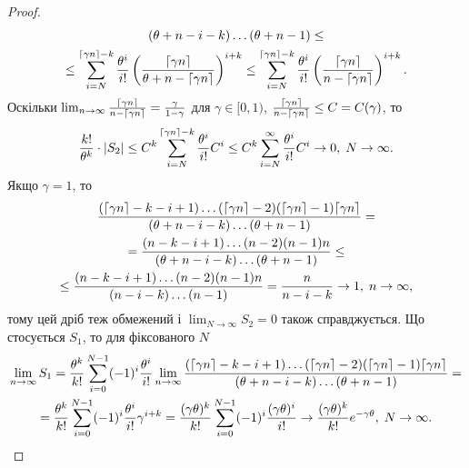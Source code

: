 \begin{proof}
\begin{gather*}
{        }{
            (\theta + n - i - k) \dots (\theta + n - 1)
        } \leq \\
        \leq 
        \sum_{i=N}^{\ceil*{\gamma n}-k}
        \frac{\theta^i}{i!}
        \left(\frac{
            \ceil*{\g n}
        }{
            \theta + n - \ceil*{\g n}
        }\right)^{i+k} \leq 
        \sum_{i=N}^{\ceil*{\gamma n}-k}
        \frac{\theta^i}{i!}
        \left(\frac{
            \ceil*{\g n}
        }{
            n - \ceil*{\g n}
        }\right)^{i+k}.
    \end{gather*}
    Оскільки $\lim_{n\to\infty} \frac{
        \ceil*{\g n}
    }{
        n - \ceil*{\g n}
    } = \frac{\gamma}{1-\gamma}$ для $\gamma \in [0, 1)$,
    $\frac{
        \ceil*{\g n}
    }{
        n - \ceil*{\g n}
    } \leq C = C(\gamma)$, то
    \begin{gather*}
        \frac{k!}{\theta^k} \cdot |S_2| \leq C^k
        \sum_{i=N}^{\ceil*{\gamma n}-k}
        \frac{\theta^i}{i!} C^i \leq
        C^k
        \sum_{i=N}^{\infty}
        \frac{\theta^i}{i!} C^i \to 0, \; N \to \infty.
    \end{gather*}
    Якщо $\gamma = 1$, то
    \begin{gather*}
        \frac{
            (\ceil*{\g n} - k - i + 1) \dots (\ceil*{\g n} - 2) (\ceil*{\g n} - 1) \ceil*{\g n}
        }{
            (\theta + n - i - k) \dots (\theta + n - 1)
        } = \\ =
        \frac{
            (n - k - i + 1) \dots (n - 2) (n - 1) n
        }{
            (\theta + n - i - k) \dots (\theta + n - 1)
        } \leq \\ \leq
        \frac{
            (n - k - i + 1) \dots (n - 2) (n - 1) n
        }{
            (n - i - k) \dots (n - 1)
        } = \frac{n}{n - i - k} \to 1, \; n\to\infty,
    \end{gather*}
    тому цей дріб теж обмежений і
    $\lim_{N\to\infty} S_2 = 0$ також справджується.
    Що стосується $S_1$, то для фіксованого $N$
    \begin{gather*}
        \lim_{n\to\infty} S_1 = \frac{\theta^k}{k!} \sum_{i=0}^{N-1} (-1)^i
        \frac{\theta^i}{i!} \lim_{n\to\infty} 
        \frac{
            (\ceil*{\g n} - k - i + 1) \dots (\ceil*{\g n} - 2) (\ceil*{\g n} - 1) \ceil*{\g n}
        }{
            (\theta + n - i - k) \dots (\theta + n - 1)
        } = \\ =
        \frac{\theta^k}{k!} \sum_{i=0}^{N-1} (-1)^i
        \frac{\theta^i}{i!} \gamma^{i+k} = 
        \frac{(\gamma\theta)^k}{k!} \sum_{i=0}^{N-1} (-1)^i
        \frac{(\gamma\theta)^i}{i!} \to \frac{(\gamma\theta)^k}{k!}e^{-\gamma\theta}, \; N\to\infty.
    \end{gather*}
\end{proof}

